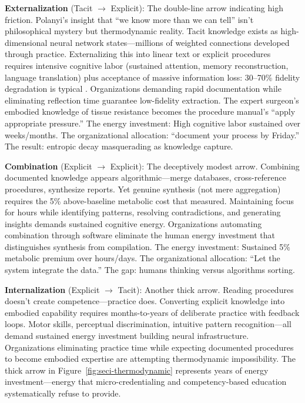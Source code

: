 \textbf{Externalization} (Tacit $\rightarrow$ Explicit): The double-line arrow indicating high friction. Polanyi's insight that ``we know more than we can tell'' \citep{polanyi1966} isn't philosophical mystery but thermodynamic reality. Tacit knowledge exists as high-dimensional neural network states---millions of weighted connections developed through practice. Externalizing this into linear text or explicit procedures requires intensive cognitive labor (sustained attention, memory reconstruction, language translation) plus acceptance of massive information loss: 30--70\% fidelity degradation is typical \citep{collins2010}. Organizations demanding rapid documentation while eliminating reflection time guarantee low-fidelity extraction. The expert surgeon's embodied knowledge of tissue resistance becomes the procedure manual's ``apply appropriate pressure.'' The energy investment: High cognitive labor sustained over weeks/months. The organizational allocation: ``document your process by Friday.'' The result: entropic decay masquerading as knowledge capture.

\textbf{Combination} (Explicit $\rightarrow$ Explicit): The deceptively modest arrow. Combining documented knowledge appears algorithmic---merge databases, cross-reference procedures, synthesize reports. Yet genuine synthesis (not mere aggregation) requires the 5\% above-baseline metabolic cost that \citet{jamadar2025} measured. Maintaining focus for hours while identifying patterns, resolving contradictions, and generating insights demands sustained cognitive energy. Organizations automating combination through software eliminate the human energy investment that distinguishes synthesis from compilation. The energy investment: Sustained 5\% metabolic premium over hours/days. The organizational allocation: ``Let the system integrate the data.'' The gap: humans thinking versus algorithms sorting.

\textbf{Internalization} (Explicit $\rightarrow$ Tacit): Another thick arrow. Reading procedures doesn't create competence---practice does. Converting explicit knowledge into embodied capability requires months-to-years of deliberate practice with feedback loops. Motor skills, perceptual discrimination, intuitive pattern recognition---all demand sustained energy investment building neural infrastructure. Organizations eliminating practice time while expecting documented procedures to become embodied expertise are attempting thermodynamic impossibility. The thick arrow in Figure~\ref{fig:seci-thermodynamic} represents years of energy investment---energy that micro-credentialing and competency-based education systematically refuse to provide.

